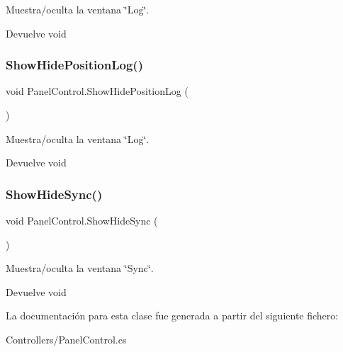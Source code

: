 Muestra/oculta la ventana \char`\"{}\+Log\char`\"{}. \begin{DoxyReturn}{Devuelve}
void 
\end{DoxyReturn}
\mbox{\label{class_panel_control_a5a25252b29b3ba097cc79778c42c469a}} 
\subsubsection{\texorpdfstring{ShowHidePositionLog()}{ShowHidePositionLog()}}
{\footnotesize\ttfamily void Panel\+Control.\+Show\+Hide\+Position\+Log (\begin{DoxyParamCaption}{ }\end{DoxyParamCaption})\hspace{0.3cm}{\ttfamily [inline]}}

Muestra/oculta la ventana \char`\"{}\+Log\char`\"{}. \begin{DoxyReturn}{Devuelve}
void 
\end{DoxyReturn}
\mbox{\label{class_panel_control_a745d60a4ef5ace7f7691418081db8f94}} 
\subsubsection{\texorpdfstring{ShowHideSync()}{ShowHideSync()}}
{\footnotesize\ttfamily void Panel\+Control.\+Show\+Hide\+Sync (\begin{DoxyParamCaption}{ }\end{DoxyParamCaption})\hspace{0.3cm}{\ttfamily [inline]}}

Muestra/oculta la ventana \char`\"{}\+Sync\char`\"{}. \begin{DoxyReturn}{Devuelve}
void 
\end{DoxyReturn}


La documentación para esta clase fue generada a partir del siguiente fichero\+:\begin{DoxyCompactItemize}
\item 
Controllers/Panel\+Control.\+cs\end{DoxyCompactItemize}
